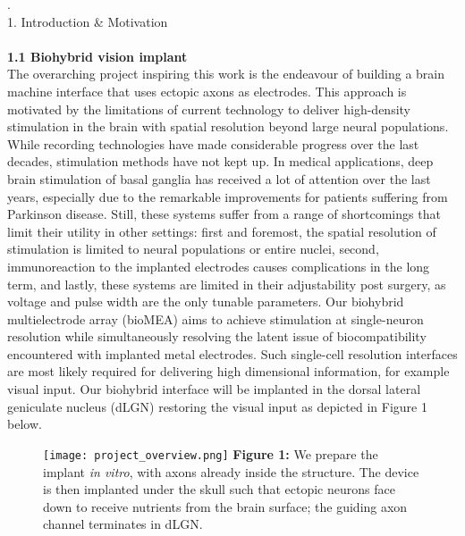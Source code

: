 \documentclass[8pt]{beamer}
\begin{document}
\begin{small}
  \tiny .\\
  \large{1. Introduction \& Motivation} \\~\\
  \selectfont
  \small
  \textbf{1.1 Biohybrid vision implant} \\ 
  	The overarching project inspiring this work is the endeavour of building a
	brain machine interface that uses ectopic axons as electrodes. This approach
	is motivated by the limitations of current technology to deliver high-density
	stimulation in the brain with spatial resolution beyond large neural
	populations. While recording technologies have made considerable progress over
	the last decades, stimulation methods have not kept up. In medical
	applications, deep brain stimulation of basal ganglia has received a lot of
	attention over the last years, especially due to the remarkable improvements
	for patients suffering from Parkinson disease. Still, these systems suffer
	from a range of shortcomings that limit their utility in other settings: first
	and foremost, the spatial resolution of stimulation is limited to neural
	populations or entire nuclei, second, immunoreaction to the implanted
	electrodes causes complications in the long term, and lastly, these systems
	are limited in their adjustability post surgery, as voltage and pulse width
	are the only tunable parameters. Our biohybrid multielectrode array (bioMEA)
	aims to achieve stimulation at single-neuron resolution while simultaneously
	resolving the latent issue of biocompatibility encountered with implanted
	metal electrodes. Such single-cell resolution interfaces are most likely
	required for delivering high dimensional information, for example visual
	input. Our biohybrid interface will be implanted in the dorsal lateral
	geniculate nucleus (dLGN) restoring the visual input as depicted in Figure
	1 below. \pagebreak
	
	\begin{figure}[h!]
		\center
		\texttt{[image: project\_overview.png]}
		\justify
		\footnotesize
		\textbf{Figure 1:} We prepare the implant \textit{in vitro}, with axons
		already inside the structure. The device is then implanted under the
		skull such that ectopic neurons face down to receive nutrients from the
		brain surface; the guiding axon channel terminates in dLGN.
	\end{figure}
	\pagebreak


\end{small}
\end{document}
